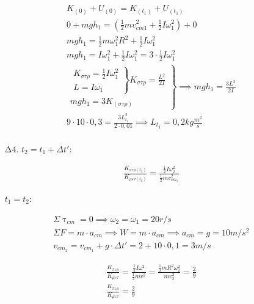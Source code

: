 \documentclass[12pt]{article}
\begin{document}
\begin{enumerate}
    \begin{gather*}
      K_{(0)}+U_{(0)}=K_{(t_1)}+U_{(t_1)} \\      0+mgh_1=\left( \frac{1}{2}mv_{cm1}^2+\frac{1}{2}Iω_1^2\right) + 0 \\
      mgh_1=\frac{1}{2}mω_1^2R^2+\frac{1}{2}Iω_1^2 \\
      mgh_1=Iω_1^2+\frac{1}{2}Iω_1^2=3\cdot\frac{1}{2}Iω_1^2 \\
      \left. \begin{matrix} \left.
        \begin{matrix}K_{στρ}=\frac{1}{2}Iω_1^2 \\ L=Iω_1
        \end{matrix}
        \right\} K_{στρ}=\frac{L^2}{2I} \\
        mgh_1=3K_{(στρ)}
      \end{matrix}
      \right\}
      \implies mgh_1=\frac{3L^2}{2I} \\
      9\cdot 10\cdot 0,3=\frac{3L_{t_1}^2}{2\cdot 0,01}
      \implies L_{t_1}=0,2kg \frac{m^2}{s} \\
    \end{gather*}

    \item [Δ4.]
    $t_2=t_1+Δt'$:

    \begin{gather*}
      \frac{K_{στρ(t_2)}}{K_{μετ(t_2)}}=\frac{\frac{1}{2}Iω_2^2}{\frac{1}{2}mv_{cm_2}^2}
    \end{gather*}

    $t_1=t_2$:

    \begin{gather*}
      Σ\uptau_{cm}=0\implies ω_2=ω_1=20r/s \\
      ΣF=m\cdot a_{cm}\implies W=m\cdot a_{cm}\implies a_{cm}=g=10 m/s^2 \\
      v_{cm_2}=v_{cm_1}+g\cdot Δt'=2+10\cdot 0,1=3m/s
    \end{gather*}

    \begin{gather*}
      \frac{K_{περ}}{K_{μετ}}=\frac{\frac{1}{2}Iω^2}{\frac{1}{2}mv^2}=\frac{\frac{1}{2}mR^2ω_2^2}{mv_2^2}=\frac{2}{9} \\
      \frac{K_{περ}}{K_{μετ}}=\frac{2}{9}
    \end{gather*}

  \end{enumerate}
\end{document}
